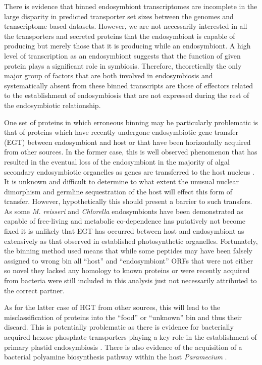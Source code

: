 There is evidence that binned endosymbiont transcriptomes are incomplete in the large
disparity in predicted transporter set sizes between the genomes and transcriptome
based datasets.  However,
we are not necessarily interested in all the transporters and secreted proteins
that the endosymbiont is capable of producing but merely those that it is producing
while an endosymbiont. 
A high level of transcription as an endosymbiont
suggests that the function of given protein plays a significant role in symbiosis.
Therefore, theoretically the only major group of factors that are both
involved in endosymbiosis and systematically absent from these binned
transcripts are those of effectors related to the establishment of endosymbiosis
that are not expressed during the rest of the endosymbiotic relationship.


One set of proteins in which erroneous binning may be particularly
problematic is that of proteins which have recently undergone endosymbiotic
gene transfer (EGT) between endosymbiont and host \citep{Timmis2004} or that have been horizontally
acquired from other sources.  In the former case,
this is well observed phenomenon that has resulted in the eventual loss
of the endosymbiont in the majority of algal secondary endosymbiotic organelles
as genes are transferred to the host nucleus
\citep{Keeling2008a,Archibald2005,Timmis2004,Keeling2004a}.
It is unknown and difficult to determine to what extent the 
unusual nuclear dimorphism and germline sequestration of the host 
will effect this form of transfer. However, hypothetically this should
present a barrier to such transfers. 
As some \textit{M. reisseri} and \textit{Chlorella} endosymbionts 
have been demonstrated as capable of free-living and metabolic
co-dependence has putatively not become fixed it is 
unlikely that EGT has occurred between host and endosymbiont as extensively
as that observed in established photosynthetic organelles. 
Fortunately, the binning method used means that while some peptides
may have been falsely assigned to wrong bin all ``host'' and
``endosymbiont'' ORFs that were not either so novel they lacked
any homology to known proteins or were recently acquired from
bacteria were still included in this analysis just not necessarily
attributed to the correct partner.

As for the latter case of HGT from other sources, this will lead to the misclassification
of proteins into the ``food'' or ``unknown'' bin and thus their discard. 
This is potentially problematic as there is evidence for bacterially acquired 
hexose-phosphate transporters playing a key role in the 
establishment of primary plastid endosymbiosis \citep{Price2012,Karkar2015a}.
There is also evidence of the acquisition of a bacterial polyamine
biosynthesis pathway within the host \textit{Paramecium} \citep{Li2015b}.


